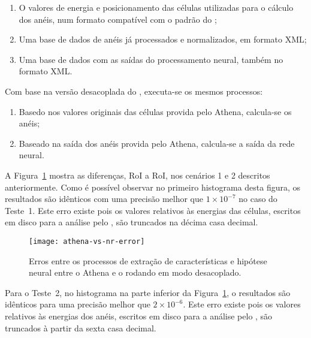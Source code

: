 \begin{enumerate}
\item O valores de energia e posicionamento das células utilizadas para o
cálculo dos anéis, num formato compatível com o padrão do ; 
\item Uma base de dados de anéis já processados e normalizados, em formato
XML;
\item Uma base de dados com as saídas do processamento neural, também no
formato XML.
\end{enumerate}

Com base na versão desacoplada do , executa-se os mesmos
processos:

\begin{enumerate}
\item Basedo nos valores originais das células provida pelo Athena, calcula-se
os anéis; 
\item Baseado na saída dos anéis provida pelo Athena, calcula-se a saída da
rede neural.
\end{enumerate}

A Figura~\ref{fig:athena-vs-nr} mostra as diferenças, RoI a RoI, nos cenários
1 e 2 descritos anteriormente. Como é possível observar no primeiro histograma
desta figura, os resultados são idênticos com uma precisão melhor que $1
\times 10^{-7}$ no caso do Teste~1. Este erro existe pois os valores relativos
às energias das células, escritos em disco para a análise pelo
, são truncados na décima casa decimal.

\begin{figure}
\begin{center}
\texttt{[image: athena-vs-nr-error]}
\end{center}
\caption{Erros entre os processos de extração de características e hipótese
neural entre o Athena e o  rodando em modo desacoplado.}
\label{fig:athena-vs-nr}
\end{figure}

Para o Teste~2, no histograma na parte inferior da
Figura~\ref{fig:athena-vs-nr}, o resultados são idênticos para uma precisão
melhor que $2 \times 10^{-6}$. Este erro existe pois os valores relativos às
energias dos anéis, escritos em disco para a análise pelo ,
são truncados à partir da sexta casa decimal.

